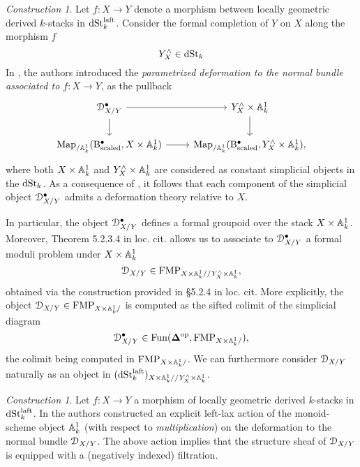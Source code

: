 \documentclass[10pt,a4paper,reqno]{amsart} %
\theoremstyle{plain}
\theoremstyle{definition}
\theoremstyle{remark}
\numberwithin{equation}{section}
\newtheorem{construction}[thm]{Construction}
\begin{document}
\begin{construction} \label{construction:def_to_the_normal_bundle}
    Let $f \colon X \to Y$ denote a morphism between locally geometric derived $k$-stacks in $\mathrm{dSt}^{\mathrm{laft}}_k$. Consider the formal completion of $Y$ on $X$ along
    the morphism $f$
        \[
            Y^\wedge_X \in \mathrm{dSt}_k  
        \]
    In \cite[\S 9.3]{Gaitsgory_Study_II}, the authors introduced the \emph{parametrized deformation to the normal bundle associated to $f \colon X \to Y$}, as the pullback
        \begin{equation} \label{eq:parametrized_deformation}
        \begin{tikzcd}
            \cD^\bullet_{X/Y} \ar{r} \ar{d} &   Y^\wedge_X \times \bbA^1_k \ar{d} \\
            \Map_{/ \bbA^1_k}(\mathrm{B}^\bullet_{\mathrm{scaled}}, X \times \bbA^1_k) \ar{r} & \Map_{/ \bbA^1_k}(\mathrm{B}^\bullet_{\mathrm{scaled}}, Y^\wedge_X \times \bbA^1_k),
        \end{tikzcd}
        \end{equation}
    where both $X \times \mathbb A^1_k$ and $Y^\wedge_X \times \mathbb A^1_k$ are considered as constant simplicial objects in the \infcat $\mathrm{dSt}_k$.
    As a consequence of \cite[Theorem 9.2.3.4]{Gaitsgory_Study_II}, it follows that
    each component of the simplicial object
    $\mathcal D_{X/Y}^\bullet$ admits a deformation theory relative to $X$.
    
    In particular, the object $\mathcal D^\bullet_{X/ Y}$ defines a formal groupoid over the stack
    $X \times \mathbb A^1_k$. Moreover, Theorem 5.2.3.4 in loc. cit. allows us to associate to $\mathcal D^\bullet_{X/Y}$ a
    formal moduli problem under $X \times \mathbb A^1_k$
           \[
               \mathcal D_{X/Y} \in \mathrm{FMP}_{X \times \mathbb A^1_k/ / Y^\wedge_X \times \mathbb A^1_k},
           \]
    obtained via the construction provided in \S 5.2.4 in loc. cit.
    More explicitly, the object $\mathcal D_{X/ Y} \in \mathrm{FMP}_{X \times \mathbb A^1_k/ }$ is computed as the sifted colimit of the simplicial diagram
        \[
            \mathcal D_{X/ Y}^\bullet \in \operatorname{Fun}(\bm{\Delta} ^\mathrm{op}, \mathrm{FMP}_{X \times \mathbb A^1_k/ })  ,
        \]
    the colimit being computed in $\mathrm{FMP}_{X \times \mathbb A^1_k/ }$. We can furthermore consider $\mathcal D_{X/Y}$
    naturally as an object in $(\mathrm{dSt}^{\mathrm{laft}}_k)_{X \times \mathbb A^1_k/ / Y^\wedge_X \times \mathbb A^1_k}$.
\end{construction}

\begin{construction}
    Let $f \colon X \to Y$ a morphism of locally geometric derived $k$-stacks in $\mathrm{dSt}_k^{\mathrm{laft}}$. In \cite[\S 9.2.5]{Gaitsgory_Study_II} the authors
    constructed an explicit left-lax action of the monoid-scheme object $\mathbb A^1_k$ (with respect to \emph{multiplication})
    on the deformation to the normal bundle $\mathcal D_{X/ Y}$. The above action
    implies that the structure sheaf of $\mathcal D_{X/ Y}$ is equipped with a (negatively indexed) filtration. 
\end{construction}
\end{document}
